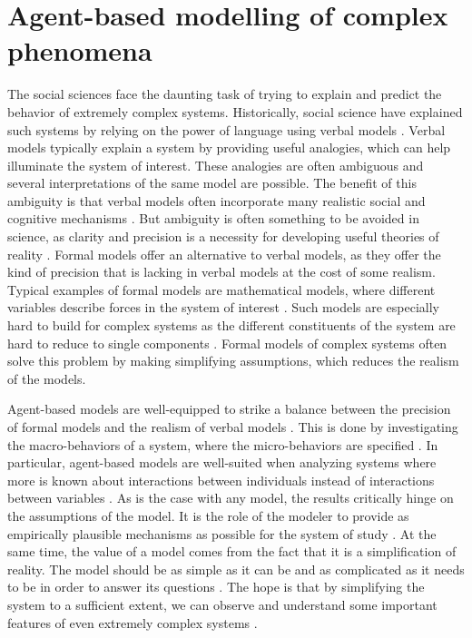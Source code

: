 \documentclass[11pt]{article}
\begin{document}
\section{Agent-based modelling of complex phenomena}
The social sciences face the daunting task of trying to explain and predict the behavior of extremely complex systems. 
Historically, social science have explained such systems by relying on the power of language using verbal models \cite{smaldino_how_2020}. Verbal models typically explain a system by providing useful analogies, which can help illuminate the system of interest. These analogies are often ambiguous and several interpretations of the same model are possible. The benefit of this ambiguity is that verbal models often incorporate many realistic social and cognitive mechanisms \cite{fogarty_ten_2022}. But ambiguity is often something to be avoided in science, as clarity and precision is a necessity for developing useful theories of reality \cite{smaldino_how_2020}. 
Formal models offer an alternative to verbal models, as they offer the kind of precision that is lacking in verbal models at the cost of some realism. Typical examples of formal models are mathematical models, where different variables describe forces in the system of interest \cite{fogarty_ten_2022}. Such models are especially hard to build for complex systems as the different constituents of the system are hard to reduce to single components \cite{smaldino_how_2020, poli2013note}. Formal models of complex systems often solve this problem by making simplifying assumptions, which reduces the realism of the models. 

Agent-based models are well-equipped to strike a balance between the precision of formal models and the realism of verbal models \cite{flache_between_2018,galesic_integrating_2021,epstein1999agent,mas2014cultural}. This is done by investigating the macro-behaviors of a system, where the micro-behaviors are specified \cite{bruch_agent-based_2015,epstein1999agent,flache_between_2018}. In particular, agent-based models are well-suited when analyzing systems where more is known about interactions between individuals instead of interactions between variables \cite{geschke2019triple}. As is the case with any model, the results critically hinge on the assumptions of the model. It is the role of the modeler to provide as empirically plausible mechanisms as possible for the system of study \cite{crooks2012introduction,epstein1999agent,page2010diversity}. At the same time, the value of a model comes from the fact that it is a simplification of reality. The model should be as simple as it can be and as complicated as it needs to be in order to answer its questions \cite{smaldino_how_2020}. The hope is that by simplifying the system to a sufficient extent, we can observe and understand some important features of even extremely complex systems \cite{fogarty_ten_2022,smaldino_how_2020,smaldino_models_2016, smaldino_models_2022}.
\end{document}
